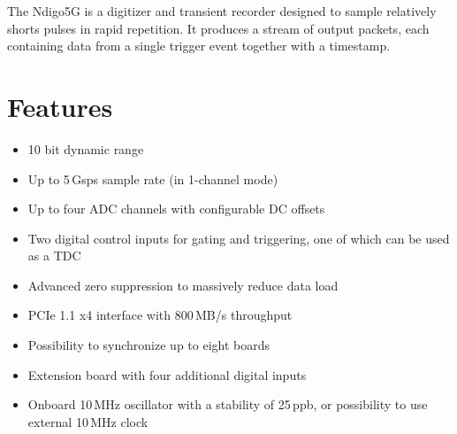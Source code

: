 The Ndigo5G is a digitizer and transient recorder designed to sample relatively shorts pulses in rapid repetition. It produces a stream of output packets, each containing data from a single trigger event together with a timestamp.
\section{Features}
	\begin{itemize}
		\item 10 bit dynamic range
		\item Up to 5\,Gsps sample rate (in 1-channel mode)
		\item Up to four ADC channels with configurable DC offsets
		\item Two digital control inputs for gating and triggering, one of
		      which can be used as a TDC
	    \item Advanced zero suppression to massively reduce data load
		\item PCIe 1.1 x4 interface with 800\,MB/s throughput
		\item Possibility to synchronize up to eight boards
		\item Extension board with four additional digital inputs
		\item Onboard 10\,MHz oscillator with a stability of 25\,ppb, or
		      possibility to use external 10\,MHz clock
	\end{itemize}